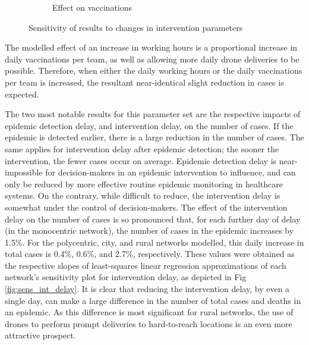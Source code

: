 \documentclass[10pt,letterpaper]{article}
\begin{document}
\begin{figure}[ht!]
\begin{subfigure}[b]{0.5\textwidth}
    \caption{Effect on vaccinations}
    \label{fig:sens_int_vaccs}
  \end{subfigure}
  \caption{Sensitivity of results to changes in intervention parameters}
\end{figure}

The modelled effect of an increase in working hours is a proportional increase in daily vaccinations per team, as well as allowing more daily drone deliveries to be possible. Therefore, when either the daily working hours or the daily vaccinations per team is increased, the resultant near-identical slight reduction in cases is expected. 

The two most notable results for this parameter set are the respective impacts of epidemic detection delay, and intervention delay, on the number of cases. If the epidemic is detected earlier, there is a large reduction in the number of cases. The same applies for intervention delay after epidemic detection; the sooner the intervention, the fewer cases occur on average. 
Epidemic detection delay is near-impossible for decision-makers in an epidemic intervention to influence, and can only be reduced by more effective routine epidemic monitoring in healthcare systems. On the contrary, while difficult to reduce, the intervention delay is somewhat under the control of decision-makers. The effect of the intervention delay on the number of cases is so pronounced that, for each further day of delay (in the monocentric network), the number of cases in the epidemic increases by 1.5\%. For the polycentric, city, and rural networks modelled, this daily increase in total cases is 0.4\%, 0.6\%, and 2.7\%, respectively. These values were obtained as the respective slopes of least-squares linear regression approximations of each network's sensitivity plot for intervention delay, as depicted in Fig \ref{fig:sens_int_delay}. It is clear that reducing the intervention delay, by even a single day, can make a large difference in the number of total cases and deaths in an epidemic. As this difference is most significant for rural networks, the use of drones to perform prompt deliveries to hard-to-reach locations is an even more attractive prospect.
\end{document}
